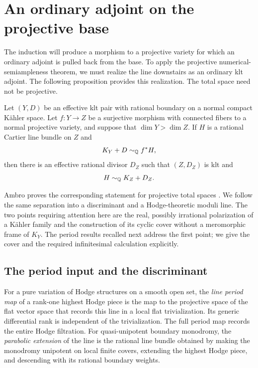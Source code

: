 \section{An ordinary adjoint on the projective base}
\label{sec:adjoint}

The induction will produce a morphism to a projective variety for which an
ordinary adjoint is pulled back from the base.  To apply the projective
numerical-semiampleness theorem, we must realize the line downstairs as an
ordinary klt adjoint.  The following proposition provides this realization.
The total space need not be projective.

\begin{proposition}
\label{adj:base}
Let $(Y,D)$ be an effective klt pair with rational boundary on a normal
compact K\"ahler space.  Let $f:Y\to Z$ be a surjective morphism with connected
fibers to a normal projective variety, and suppose that
$\dim Y>\dim Z$.  If $H$ is a rational Cartier line bundle on $Z$ and
\begin{equation}
\label{adj:initial}
                         K_Y+D\sim_{\mathbb Q} f^*H,
\end{equation}
then there is an effective rational divisor $D_Z$ such that $(Z,D_Z)$ is klt
and
\[
                         H\sim_{\mathbb Q} K_Z+D_Z.
\]
\end{proposition}

Ambro proves the corresponding statement for projective total spaces
\cite[Theorem~0.2]{Ambro}.  We follow the same separation into a discriminant
and a Hodge-theoretic moduli line.  The two points requiring attention here
are the real, possibly irrational polarization of a K\"ahler family and the
construction of its cyclic cover without a meromorphic frame of $K_Y$.
The period results recalled next address the first point; we give the cover
and the required infinitesimal calculation explicitly.

\subsection{The period input and the discriminant}

For a pure variation of Hodge structures on a smooth open set, the
\emph{line period map} of a rank-one highest Hodge piece is the map to the
projective space of the flat vector space that records this line in a local
flat trivialization.  Its generic differential rank is independent of the
trivialization.  The full period map records the entire Hodge filtration.
For quasi-unipotent boundary monodromy, the \emph{parabolic extension} of the
line is the rational line bundle obtained by making the monodromy unipotent
on local finite covers, extending the highest Hodge piece, and descending
with its rational boundary weights.

